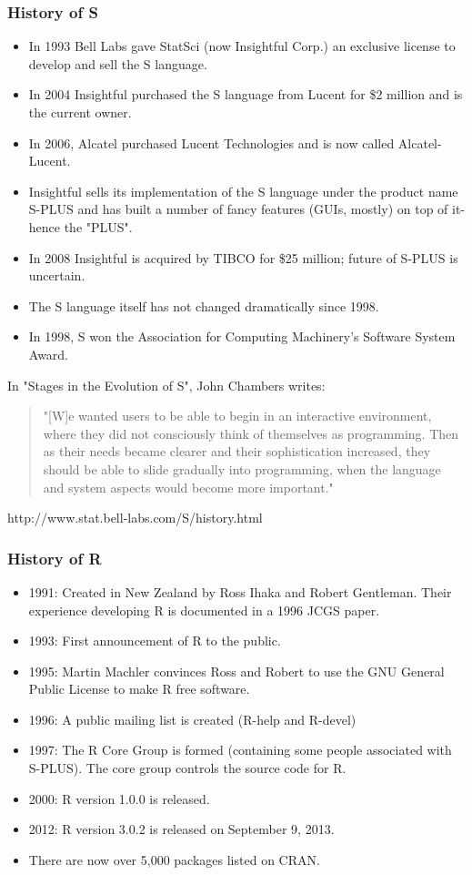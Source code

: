 \documentclass{beamer}\usepackage[]{graphicx}\usepackage[]{color}
\begin{document}
\begin{frame}[c]
	\frametitle{History of S}
	\begin{itemize}
	\item In 1993 Bell Labs gave StatSci (now Insightful Corp.) an exclusive license to develop and sell the S language.
	\item In 2004 Insightful purchased the S language from Lucent for \$2 million and is the current owner.
	\item In 2006, Alcatel purchased Lucent Technologies and is now called Alcatel-Lucent.
	\item Insightful sells its implementation of the S language under the product name S-PLUS and has built a number of fancy features (GUIs, mostly) on top of it-hence the "PLUS".
	\item In 2008 Insightful is acquired by TIBCO for \$25 million; future of S-PLUS is uncertain.
	\item The S language itself has not changed dramatically since 1998.
	\item In 1998, S won the Association for Computing Machinery's Software System Award.
	\end{itemize}
\end{frame}

\begin{frame}[c]
In "Stages in the Evolution of S", John Chambers writes:
\begin{quote}
"[W]e wanted users to be able to begin in an interactive environment, where they did not consciously think of themselves as programming. Then as their needs became clearer and their sophistication increased, they should be able to slide gradually into programming, when the language and system aspects would become more important."
\end{quote}
http://www.stat.bell-labs.com/S/history.html
\end{frame}

\begin{frame}[c]
	\frametitle{History of R}
	\begin{itemize}
	\item 1991: Created in New Zealand by Ross Ihaka and Robert Gentleman. Their experience developing R is documented in a 1996 JCGS paper.
	\item 1993: First announcement of R to the public.
	\item 1995: Martin Machler convinces Ross and Robert to use the GNU General Public License to make R free software.
	\item 1996: A public mailing list is created (R-help and R-devel)
	\item 1997: The R Core Group is formed (containing some people associated with S-PLUS). The core group controls the source code for R.
	\item 2000: R version 1.0.0 is released.
	\item 2012: R version 3.0.2 is released on September 9, 2013.
	\item There are now over 5,000 packages listed on CRAN. 
	\end{itemize}
\end{frame}
\end{document}
